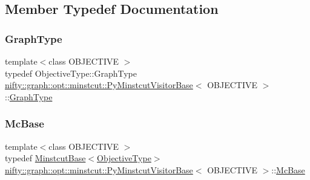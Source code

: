 \subsection{Member Typedef Documentation}
\mbox{\label{classnifty_1_1graph_1_1opt_1_1minstcut_1_1PyMinstcutVisitorBase_a7eca98be6e05ef40752b485bf1126312}} 
\subsubsection{\texorpdfstring{Graph\+Type}{GraphType}}
{\footnotesize\ttfamily template$<$class O\+B\+J\+E\+C\+T\+I\+VE $>$ \\
typedef Objective\+Type\+::\+Graph\+Type \hyperlink{classnifty_1_1graph_1_1opt_1_1minstcut_1_1PyMinstcutVisitorBase}{nifty\+::graph\+::opt\+::minstcut\+::\+Py\+Minstcut\+Visitor\+Base}$<$ O\+B\+J\+E\+C\+T\+I\+VE $>$\+::\hyperlink{classnifty_1_1graph_1_1opt_1_1minstcut_1_1PyMinstcutVisitorBase_a7eca98be6e05ef40752b485bf1126312}{Graph\+Type}}

\mbox{\label{classnifty_1_1graph_1_1opt_1_1minstcut_1_1PyMinstcutVisitorBase_a77d46bc1780dd5d3aafdb832f529859b}} 
\subsubsection{\texorpdfstring{Mc\+Base}{McBase}}
{\footnotesize\ttfamily template$<$class O\+B\+J\+E\+C\+T\+I\+VE $>$ \\
typedef \hyperlink{classnifty_1_1graph_1_1opt_1_1minstcut_1_1MinstcutBase}{Minstcut\+Base}$<$\hyperlink{classnifty_1_1graph_1_1opt_1_1minstcut_1_1PyMinstcutVisitorBase_ae5e6bbf1ab459caf331a335a06e60a88}{Objective\+Type}$>$ \hyperlink{classnifty_1_1graph_1_1opt_1_1minstcut_1_1PyMinstcutVisitorBase}{nifty\+::graph\+::opt\+::minstcut\+::\+Py\+Minstcut\+Visitor\+Base}$<$ O\+B\+J\+E\+C\+T\+I\+VE $>$\+::\hyperlink{classnifty_1_1graph_1_1opt_1_1minstcut_1_1PyMinstcutVisitorBase_a77d46bc1780dd5d3aafdb832f529859b}{Mc\+Base}}


